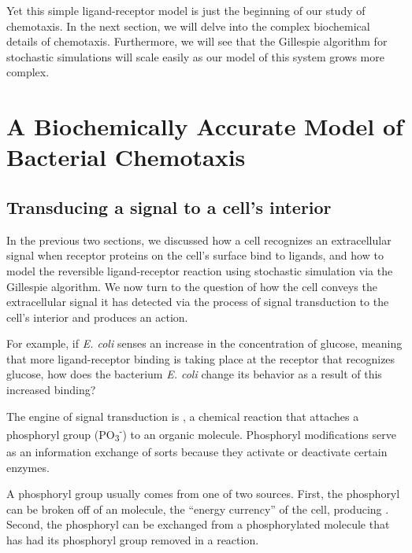 Yet this simple ligand-receptor model is just the beginning of our study of chemotaxis. In the next section, we will delve into the complex biochemical details of chemotaxis. Furthermore, we will see that the Gillespie algorithm for stochastic simulations will scale easily as our model of this system grows more complex.

\FloatBarrier
{}

\section{A Biochemically Accurate Model of Bacterial Chemotaxis}
\label{sec:a_biochemically_accurate_model_of_bacterial_chemotaxis}

\subsection{Transducing a signal to a cell's interior}

In the previous two sections, we discussed how a cell recognizes an extracellular signal when receptor proteins on the cell's surface bind to ligands, and how to model the reversible ligand-receptor reaction using stochastic simulation via the Gillespie algorithm. We now turn to the question of how the cell conveys the extracellular signal it has detected via the process of signal transduction to the cell's interior and produces an action.

For example, if \textit{E. coli} senses an increase in the concentration of glucose, meaning that more ligand-receptor binding is taking place at the receptor that recognizes glucose, how does the bacterium \textit{E. coli} change its behavior as a result of this increased binding?

The engine of signal transduction is , a chemical reaction that attaches a phosphoryl group (PO\textsubscript{3}\textsuperscript{-}) to an organic molecule.  Phosphoryl modifications serve as an information exchange of sorts because they activate or deactivate certain enzymes.

A phosphoryl group usually comes from one of two sources. First, the phosphoryl can be broken off of an  molecule, the ``energy currency'' of the cell, producing . Second, the phosphoryl can be exchanged from a phosphorylated molecule that has had its phosphoryl group removed in a  reaction.

